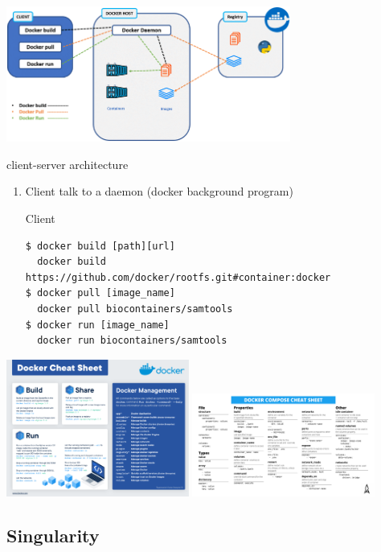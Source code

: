 \begin{frame}
\centering\includegraphics[width=0.7\textwidth]{images/Docker-Architecture.png}
\end{frame}
\begin{frame}[fragile]
client-server architecture
\begin{enumerate}
\item Client talk to a daemon (docker background program)
\begin{block}{Client}
\begin{verbatim}
$ docker build [path][url] 
  docker build https://github.com/docker/rootfs.git#container:docker
$ docker pull [image_name]
  docker pull biocontainers/samtools
$ docker run [image_name]
  docker run biocontainers/samtools
\end{verbatim}
\end{block}
\end{enumerate}

\end{frame}
\begin{frame}
\includegraphics[width=0.45\textwidth]{images/docker-cheat-sheet.pdf}
\includegraphics[width=0.45\textwidth]{images/docker-compose-cheat-sheet.pdf}

\end{frame}
\subsection{Singularity}


